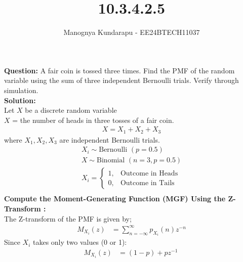 \documentclass[journal]{IEEEtran}
\begin{document}

\vspace{3cm}

\title{10.3.4.2.5}
\author{Manognya Kundarapu - EE24BTECH11037
}
{\let\newpage\relax\maketitle}

\renewcommand{\thefigure}{\theenumi}
\renewcommand{\thetable}{\theenumi}
\setlength{\intextsep}{10pt} %


\renewcommand{\thetable}{\theenumi}
\textbf{Question:} A fair coin is tossed three times. Find the PMF of the random variable using the sum of three independent Bernoulli trials. Verify through simulation.\\
\textbf{Solution:}\\
    Let $X$ be a discrete random variable\\
    $X$ = the number of heads in three tosses of a fair coin.\\
    \begin{align}
        X = X_1+X_2+X_3
    \end{align}
    where $X_1,X_2,X_3$ are independent Bernoulli trials.\\
    \begin{align}
        X_i\sim\text{Bernoulli $(p=0.5)$}\\
        X\sim\text{Binomial $(n=3,p=0.5)$}\\
        X_i = 
\begin{cases}
	1, & \text{Outcome in Heads}\\
	0, & \text{Outcome in Tails}
\end{cases}\\
    \end{align}
    \textbf{Compute the Moment-Generating Function (MGF) Using the Z-Transform  :}\\
    The Z-transform of the PMF is given by;
    \begin{align}
        M_{X_i}(z) &= \sum_{n=-\infty}^{\infty} p_{X_i}(n) z^{-n}
    \end{align}
    Since $X_i$ takes only two values (0 or 1):
    \begin{align}
        M_{X_i}(z) &= (1-p)+pz^{-1}\
    \end{align}
\end{document}
